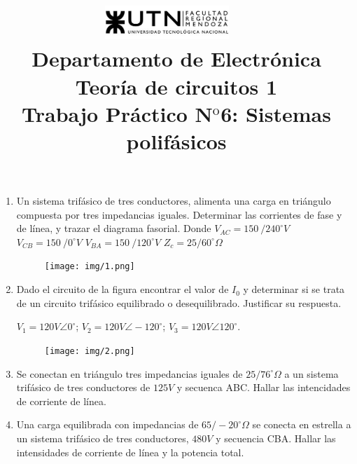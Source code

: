 \documentclass[10pt,a4paper]{article}
\title{
	\textsc{\includegraphics[width=0.35\textwidth]{logoUTN.jpg}} ~\\
	{\large Departamento de Electr\'onica}\\ 
	[0.1cm]
	{\Huge{Teoría de circuitos 1}} \\
	[0.25cm]
	{\Large{Trabajo Práctico N$^{\text {o}}$6: Sistemas polifásicos}		\\
}}
\author{}
\date{}
\begin{document}
	\maketitle
	

\begin{enumerate}
	

\item Un sistema trifásico de tres conductores, alimenta una carga en triángulo compuesta por tres impedancias iguales. Determinar las corrientes de fase y de línea, y trazar el diagrama fasorial. Donde $V_{AC}=150\ /240^{\circ}V$ $V_{CB}=150\ /0^{\circ}V$ $V_{BA}=150\ /120^{\circ}V$ $Z_c=25/60^{\circ}\Omega$

\begin{figure}[H]
	\centering
	\texttt{[image: img/1.png]}
	\label{e1}
\end{figure}


\item Dado el circuito de la figura encontrar el valor de $I_0$ y determinar si se trata de un circuito trifásico equilibrado o desequilibrado. Justificar su respuesta.

$V_1=120V \angle 0^{\circ}$;
$V_2=120V \angle -120^{\circ}$;
$V_3=120V \angle 120^{\circ}$.

\begin{figure}[H]
	\centering
	\texttt{[image: img/2.png]}
	\label{e2}
\end{figure}

\item Se conectan en triángulo tres impedancias iguales de $25/76^{\circ}\Omega$ a un sistema trifásico de tres conductores de $125 V$ y secuenca ABC. Hallar las intencidades de corriente de línea.


\item Una carga equilibrada con impedancias de $65/-20^{\circ}\Omega$ se conecta en estrella a un sistema trifásico de tres conductores, $480V$ y secuencia CBA. Hallar las intensidades de corriente de línea y la potencia total.




\end{enumerate}
\end{document}
